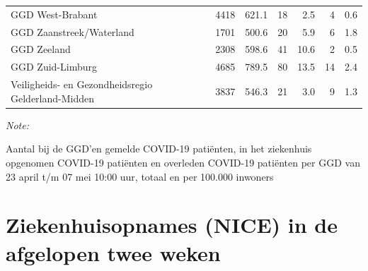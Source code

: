 \documentclass[
  english,
  man,floatsintext]{apa6}
\begin{document}
\begin{table}
\begin{threeparttable}
\begin{tabular}{lrrrrrr}
GGD West-Brabant & 4418 & 621.1 & 18 & 2.5 & 4 & 0.6\\
GGD Zaanstreek/Waterland & 1701 & 500.6 & 20 & 5.9 & 6 & 1.8\\
GGD Zeeland & 2308 & 598.6 & 41 & 10.6 & 2 & 0.5\\
GGD Zuid-Limburg & 4685 & 789.5 & 80 & 13.5 & 14 & 2.4\\
Veiligheids- en Gezondheidsregio Gelderland-Midden & 3837 & 546.3 & 21 & 3.0 & 9 & 1.3\\
\bottomrule
\end{tabular}
\begin{tablenotes}
\item \textit{Note: } 
\item Aantal bij de GGD’en gemelde COVID-19 patiënten, in het ziekenhuis opgenomen COVID-19 patiënten en overleden COVID-19 patiënten per GGD van 23 april t/m 07 mei 10:00 uur, totaal en per 100.000 inwoners
\end{tablenotes}
\end{threeparttable}
\endgroup{}
\end{table}

\newpage

\hypertarget{ziekenhuisopnames-nice-in-de-afgelopen-twee-weken}{%
\section{Ziekenhuisopnames (NICE) in de afgelopen twee weken}\label{ziekenhuisopnames-nice-in-de-afgelopen-twee-weken}}
\end{document}
